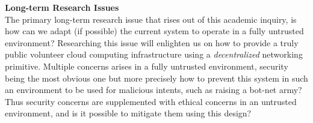 \documentclass[12pt, titlepage]{uo_temp}
\begin{document}
     \textbf{Long-term Research Issues}\\
     The primary long-term research issue that rises out of this academic inquiry, is how
     can we adapt (if possible) the current system to operate in a fully untrusted
     environment? Researching this issue will enlighten us on how to provide a truly
     public volunteer cloud computing infrastructure using a \emph{decentralized}
     networking primitive. Multiple concerns arises in a fully untrusted environment,
     security being the most obvious one but more precisely how to prevent this system in
     such an environment to be used for malicious intents, such as raising a bot-net army?
     Thus security concerns are supplemented with ethical concerns in an untrusted
     environment, and is it possible to mitigate them using this design?
\end{document}
